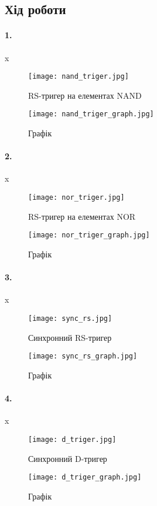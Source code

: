 \documentclass[12pt]{extarticle}
\begin{document}
\subsection*{Хід роботи}
\paragraph{1.}x

\vspace{12pt}
\begin{figure}[H]
    \centering
    \texttt{[image: nand\_triger.jpg]}
    \caption{RS-тригер на елементах NAND}
\end{figure}
\begin{figure}[H]
    \centering
    \texttt{[image: nand\_triger\_graph.jpg]}
    \caption{Графік}
\end{figure}

\paragraph{2.}x
\begin{figure}[H]
    \centering
    \texttt{[image: nor\_triger.jpg]}
    \caption{RS-тригер на елементах NOR}
\end{figure}
\begin{figure}[H]
    \centering
    \texttt{[image: nor\_triger\_graph.jpg]}
    \caption{Графік}
\end{figure}

\vspace{12pt}

\paragraph{3.}x

\begin{figure}[H]
    \centering
    \texttt{[image: sync\_rs.jpg]}
    \caption{Синхронний RS-тригер}
\end{figure}
\begin{figure}[H]
    \centering
    \texttt{[image: sync\_rs\_graph.jpg]}
    \caption{Графік}
\end{figure}
\paragraph{4.}x
\begin{figure}[H]
    \centering
    \texttt{[image: d\_triger.jpg]}
    \caption{Синхронний D-тригер}
\end{figure}
\begin{figure}[H]
    \centering
    \texttt{[image: d\_triger\_graph.jpg]}
    \caption{Графік}
\end{figure}
\end{document}
